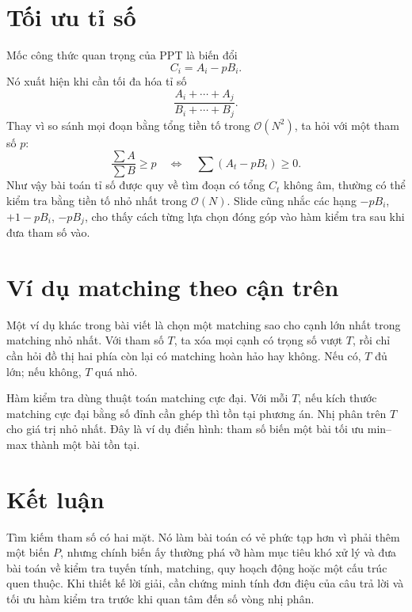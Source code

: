 \documentclass[11pt]{article}
\newcommand{\Oh}{\mathcal{O}}
\begin{document}
\section{Tối ưu tỉ số}

Mốc công thức quan trọng của PPT là biến đổi
\[
  C_i=A_i-pB_i.
\]
Nó xuất hiện khi cần tối đa hóa tỉ số
\[
  \frac{A_i+\cdots+A_j}{B_i+\cdots+B_j}.
\]
Thay vì so sánh mọi đoạn bằng tổng tiền tố trong \(\Oh(N^2)\), ta hỏi với một
tham số \(p\):
\[
  \frac{\sum A}{\sum B}\ge p
  \quad\Longleftrightarrow\quad
  \sum(A_t-pB_t)\ge 0.
\]
Như vậy bài toán tỉ số được quy về tìm đoạn có tổng \(C_t\) không âm, thường
có thể kiểm tra bằng tiền tố nhỏ nhất trong \(\Oh(N)\). Slide cũng nhắc các
hạng \(-pB_i\), \(+1-pB_i\), \(-pB_j\), cho thấy cách từng lựa chọn đóng góp
vào hàm kiểm tra sau khi đưa tham số vào.

\section{Ví dụ matching theo cận trên}

Một ví dụ khác trong bài viết là chọn một matching sao cho cạnh lớn nhất trong
matching nhỏ nhất. Với tham số \(T\), ta xóa mọi cạnh có trọng số vượt \(T\),
rồi chỉ cần hỏi đồ thị hai phía còn lại có matching hoàn hảo hay không. Nếu
có, \(T\) đủ lớn; nếu không, \(T\) quá nhỏ.

Hàm kiểm tra dùng thuật toán matching cực đại. Với mỗi \(T\), nếu kích thước
matching cực đại bằng số đỉnh cần ghép thì tồn tại phương án. Nhị phân trên
\(T\) cho giá trị nhỏ nhất. Đây là ví dụ điển hình: tham số biến một bài tối
ưu min--max thành một bài tồn tại.

\section{Kết luận}

Tìm kiếm tham số có hai mặt. Nó làm bài toán có vẻ phức tạp hơn vì phải thêm
một biến \(P\), nhưng chính biến ấy thường phá vỡ hàm mục tiêu khó xử lý và
đưa bài toán về kiểm tra tuyến tính, matching, quy hoạch động hoặc một cấu
trúc quen thuộc. Khi thiết kế lời giải, cần chứng minh tính đơn điệu của câu
trả lời và tối ưu hàm kiểm tra trước khi quan tâm đến số vòng nhị phân.
\end{document}

